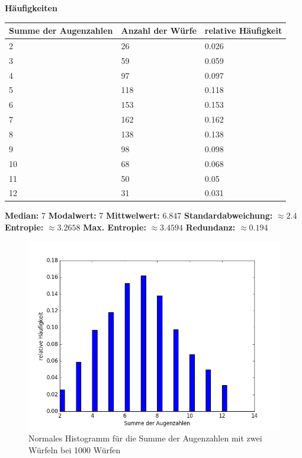 \documentclass[fleqn,a4paper,12pt]{article}
\begin{document}
\textbf{Häufigkeiten}
\begin{center}
	\begin{tabular}{ | l | l | l | }
		\hline
		Summe der Augenzahlen & Anzahl der Würfe & relative Häufigkeit \\ \hline
		2 & 26 & 0.026 \\ \hline
		3 & 59 & 0.059 \\ \hline
		4 & 97 & 0.097 \\ \hline
		5 & 118 & 0.118 \\ \hline
		6 & 153 & 0.153 \\ \hline
		7 & 162 & 0.162 \\ \hline
		8 & 138 & 0.138 \\ \hline
		9 & 98 & 0.098 \\ \hline
		10 & 68 & 0.068 \\ \hline
		11 & 50 & 0.05 \\ \hline
		12 & 31 & 0.031 \\ \hline
	\end{tabular}  
\end{center}
\textbf{Median:} 7 \newline
\textbf{Modalwert:} 7 \newline
\textbf{Mittwelwert:} 6.847 \newline
\textbf{Standardabweichung:} $\approx 2.4$ \newline
\textbf{Entropie:} $\approx 3.2658$ \newline
\textbf{Max. Entropie:} $\approx 3.4594$ \newline
\textbf{Redundanz:} $\approx 0.194$ \newline
\begin{figure}
	\includegraphics[width=1.0\textwidth]{A04_histo1.png}
	\caption{Normales Histogramm für die Summe der Augenzahlen mit zwei Würfeln bei 1000 Würfen}
\end{figure}
\end{document}

